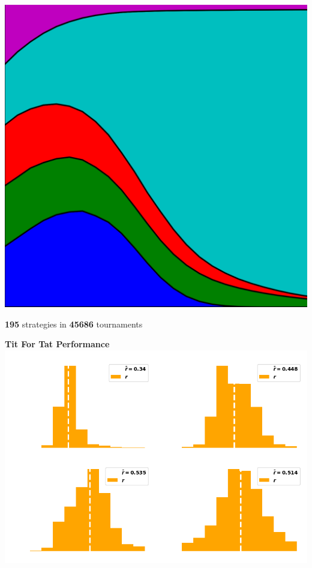 \documentclass{beamer}
\begin{document}
\begin{frame}
    \begin{center}
        \includegraphics[width=.25\textwidth]{static/axelrod-logo.png}
    \end{center}
\end{frame}

\begin{frame}
    \begin{center}
    \Large{\textbf{195}} \small{strategies in} \Large{\textbf{45686}} \small{tournaments}
    \end{center}
\end{frame}

\begin{frame}
    \begin{center}
        \textbf{Tit For Tat Performance} \\ \vspace{1cm}
        \includegraphics[width=.8\textwidth]{static/tit_for_tat_r_distributions.png} 
    \end{center}
\end{frame}
\end{document}
